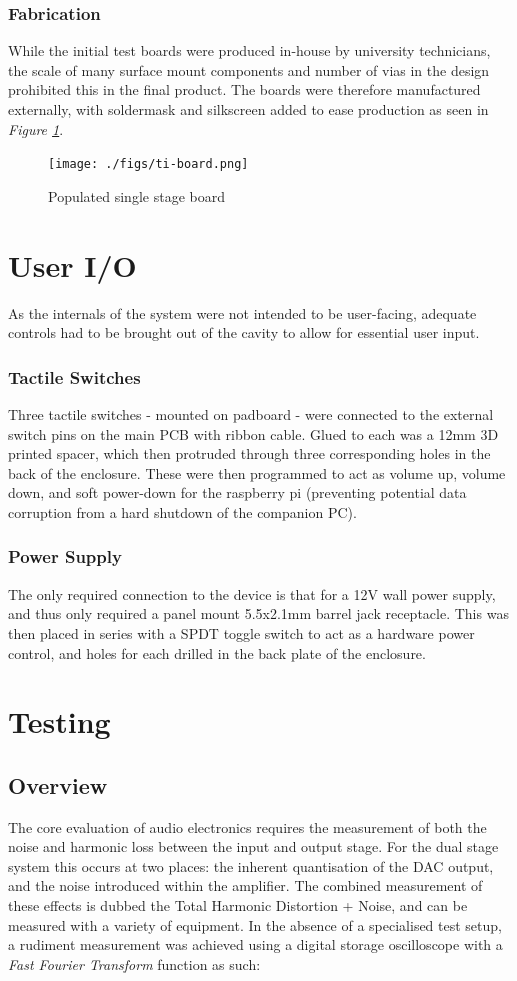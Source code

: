 \documentclass[main.tex]{subfiles}
\begin{document}
\subsubsection{Fabrication}

While the initial test boards were produced in-house by university technicians, the scale of many surface mount components and number of vias in the design prohibited this in the final product. The boards were therefore manufactured externally, with soldermask and silkscreen added to ease production as seen in \textit{Figure \ref{fig:ti-board}}. 

\begin{figure}[H]
    \centering
    \texttt{[image: ./figs/ti-board.png]}
    \caption{Populated single stage board}
    \label{fig:ti-board}
\end{figure}

\section{User I/O}
As the internals of the system were not intended to be user-facing, adequate controls had to be brought out of the cavity to allow for essential user input. 
\subsubsection{Tactile Switches}
Three tactile switches - mounted on padboard - were connected to the external switch pins on the main PCB with ribbon cable. Glued to each was a 12mm 3D printed spacer, which then protruded through three corresponding holes in the back of the enclosure. These were then programmed to act as volume up, volume down, and soft power-down for the raspberry pi (preventing potential data corruption from a hard shutdown of the companion PC).
\subsubsection{Power Supply}
The only required connection to the device is that for a 12V wall power supply, and thus only required a panel mount 5.5x2.1mm barrel jack receptacle. This was then placed in series with a SPDT toggle switch to act as a hardware power control, and holes for each drilled in the back plate of the enclosure.

\section{Testing}
\subsection{Overview}
The core evaluation of audio electronics requires the measurement of both the noise and harmonic loss between the input and output stage. For the dual stage system this occurs at two places: the inherent quantisation of the DAC output, and the noise introduced within the amplifier. The combined measurement of these effects is dubbed the Total Harmonic Distortion + Noise, and can be measured with a variety of equipment. In the absence of a specialised test setup, a rudiment measurement was achieved using a digital storage oscilloscope with a \textit{Fast Fourier Transform} function as such:
\end{document}
